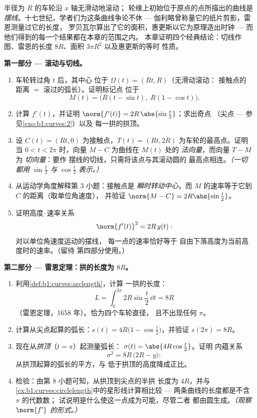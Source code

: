 \begin{problem}\label{pb:b1:curves:1}
半径为 $R$ 的车轮沿 $x$ 轴无滑动地滚动；
轮缘上初始位于原点的点所描出的曲线是
\emph{摆线}。十七世纪，学者们为这条曲线争论不休
--- 伽利略曾称量它的纸片剪影，雷恩测量过它的长度，
罗贝瓦尔算出了它的面积，惠更斯以它为原理造出时钟 --- 而
他们得到的每一个结果都在本章的范围之内。
本章证明四个经典结论：切线作图、雷恩的长度
$8R$、面积 $3\pi R^2$ 以及惠更斯的等时
性质。

\medskip
\noindent\textbf{第一部分 --- 滚动与切线。}
\begin{enumerate}
  \item 车轮转过角 $t$ 后，其中心
        位于 $\Omega(t) = (Rt, R)$（无滑动滚动：
        接触点的距离 $=$ 滚过的弧长）。证明标记点
        位于
        \[
        M(t) = \bigl(R(t - \sin t),\; R(1 - \cos t)\bigr).
        \]
  \item 计算 $f'(t)$，并证明 $\norm{f'(t)} =
        2R\,\abs{\sin\frac t2}$；求出奇点
        （尖点 --- 参见\cref{exo:b1:curves:2}）以及
        每一拱的拱顶。
  \item 设 $C(t) = (Rt, 0)$ 为接触点，$T(t) =
        (Rt, 2R)$ 为车轮的最高点。证明当 $0 < t <
        2\pi$ 时，向量 $M - C$ 为曲线在
        $M(t)$ 处的 \emph{法向量}，而向量 $T - M$ 为 \emph{切向量}：要作
        摆线的切线，只需将该点与其滚动圆的
        最高点相连。\emph{（一切都用
        $\sin\frac t2$ 与 $\cos\frac t2$ 表示。）}
  \item 从运动学角度解释第 3 小题：接触点是
        \emph{瞬时转动中心}，而
        $M$ 的速率等于它到 $C$ 的距离（取单位角速度），
        并验证 $\norm{M - C} = 2R\abs{\sin\frac t2}$。
  \item 证明高度--速率关系
        \[
        \norm{f'(t)}^2 = 2R\,y(t) :
        \]
        对以单位角速度运动的摆线，
        每一点的速率恰好等于
        自由下落高度为当前高度时的速率。（留待
        第四部分使用。）
\end{enumerate}

\medskip
\noindent\textbf{第二部分 --- 雷恩定理：拱的长度为
$8R$。}
\begin{enumerate}[resume]
  \item 利用\cref{def:b1:curves:arclength}，计算
        一拱的长度：
        \[
        L = \int_0^{2\pi} 2R\sin\frac t2\,\dd t = 8R
        \]
        （雷恩定理，1658 年）。恰为四个车轮直径，
        且不出现任何 $\pi$。
  \item 计算从尖点起算的弧长：$s(t) =
        4R\bigl(1 - \cos\frac t2\bigr)$，并验证 $s(2\pi) =
        8R$。
  \item 现在从\emph{拱顶}（$t = \pi$）起测量弧长：
        $\sigma(t) = \abs{4R\cos\frac t2}$。证明
        内蕴关系
        \[
        \sigma^2 = 8R\,\bigl(2R - y\bigr) :
        \]
        从拱顶起算的弧长的平方，与
        低于拱顶的高度降成正比。
  \item 检验：由第 8 小题可知，从拱顶到尖点的半拱
        长度为 $4R$，并与
        \cref{ex:b1:curves:circlelength}中的星形线计算相比较
        --- 两条曲线的长度都是不含 $\pi$ 的代数数；
        试说明是什么使这一点成为可能，尽管二者
        都由圆生成。\emph{（观察
        $\norm{f'}$ 的形式。）}
\end{enumerate}


\end{problem}
